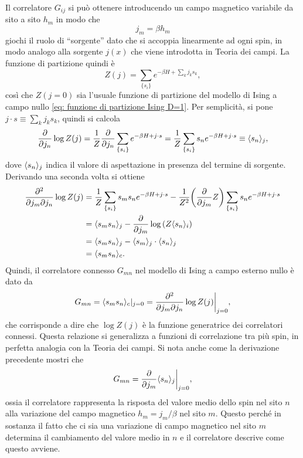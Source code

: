 Il correlatore $G_{ij}$ si può ottenere introducendo un campo magnetico variabile da sito a sito $h_m$ in modo che
\begin{equation}
    j_m = \beta h_m
\end{equation}
giochi il ruolo di ``sorgente'' dato che si accoppia linearmente ad ogni spin, in modo analogo alla sorgente $j(x)$ che viene introdotta in Teoria dei campi. La funzione di partizione quindi è
\begin{equation}
    Z(j) = \sum_{\{s_i\}} e^{-\beta H + \sum_k j_k s_k},
\end{equation}
così che $Z(j=0)$ sia l'usuale funzione di partizione del modello di Ising a campo nullo \eqref{eq: funzione di partizione Ising D=1}. Per semplicità, si pone $j \cdot s \equiv \sum_k j_k s_k$, quindi si calcola
\begin{equation}
    \frac{\partial}{\partial j_n} \log Z(j)
    = \frac{1}{Z} \frac{\partial}{\partial j_n} \sum_{\{s_i\}} e^{-\beta H + j \cdot s}
    = \frac{1}{Z} \sum_{\{s_i\}} s_n e^{-\beta H + j \cdot s}
    \equiv \langle s_n \rangle_j,
\end{equation}
dove $\langle s_n \rangle_j$ indica il valore di aspettazione in presenza del termine di sorgente. Derivando una seconda volta si ottiene
\begin{equation}
    \begin{split}
        \frac{\partial^2}{\partial j_m \partial j_n} \log Z(j)
        &= \frac{1}{Z} \sum_{\{s_i\}} s_m s_n e^{-\beta H + j \cdot s} - \frac{1}{Z^2}\bigg(\frac{\partial}{\partial j_m}Z\bigg)\sum_{\{s_i\}} s_n e^{-\beta H + j \cdot s} \\
        &= \langle s_m s_n \rangle_j - \frac{\partial}{\partial j_m}\log{(Z\langle s_n \rangle_i)} \\
        &= \langle s_m s_n \rangle_j - \langle s_m \rangle_j\cdot\langle s_n \rangle_j \\
        &= \langle s_ms_n \rangle_c.
    \end{split}
\end{equation}
Quindi, il correlatore connesso $G_{mn}$ nel modello di Ising a campo esterno nullo è dato da
\begin{equation}
    G_{mn} = \langle s_m s_n \rangle_c|_{j = 0} = \frac{\partial^2}{\partial j_m \partial j_n} \log Z(j) \bigg|_{j=0},
\end{equation}
che corrisponde a dire che $\log{Z(j)}$ è la funzione generatrice dei correlatori connessi. Questa relazione si generalizza a funzioni di correlazione tra più spin, in perfetta analogia con la Teoria dei campi. Si nota anche come la derivazione precedente mostri che
\begin{equation}
    G_{mn} = \frac{\partial}{\partial j_m} \langle s_n \rangle_j \bigg|_{j=0},
\end{equation}
ossia il correlatore rappresenta la risposta del valore medio dello spin nel sito $n$ alla variazione del campo magnetico $h_m = j_m / \beta$ nel sito $m$. Questo perché in sostanza il fatto che ci sia una variazione di campo magnetico nel sito $m$ determina il cambiamento del valore medio in $n$ e il correlatore descrive come questo avviene.

